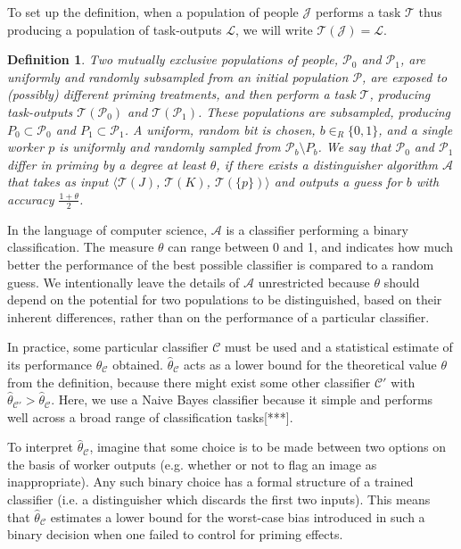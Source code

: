 \documentclass[a4paper]{report}
\newtheorem*{mydef}{Definition}
\begin{document}
To set up the definition, when a population of people $\mathcal{J}$ performs
a task $\mathcal{T}$ thus producing a population of task-outputs $\mathcal{L}$,
we will write $\mathcal{T}(\mathcal{J}) = \mathcal{L}$.

\vspace{2mm}
\begin{mydef}
	\upshape
	Two mutually exclusive populations of people, $\mathcal{P}_0$ and 
	$\mathcal{P}_1$, are uniformly and randomly subsampled from an initial 
	population $\mathcal{P}$, are exposed to (possibly) different priming 
	treatments, and then perform a task $\mathcal{T}$, 
	producing task-outputs $\mathcal{T}(\mathcal{P}_0)$ and 
	$\mathcal{T}(\mathcal{P}_1)$.
	These populations are subsampled, producing 
	$P_0 \subset \mathcal{P}_0$ and
	$P_1 \subset \mathcal{P}_1$. A uniform, random bit is chosen, 
	$b\in _R \{0,1\}$, and a single worker $p$ is uniformly and randomly 
	sampled from 
	$\mathcal{P}_b \setminus P_b$.
	We say that $\mathcal{P}_0$ and $\mathcal{P}_1$ 
	\emph{differ in priming by a degree at least $\theta$},
	if there exists a \emph{distinguisher algorithm} $\mathcal{A}$ that takes as input 
	$\langle\mathcal{T}(J)$, $\mathcal{T}(K)$, $\mathcal{T}(\{p\})\rangle$
	and outputs a guess for $b$ with accuracy $\frac{1+\theta}{2}$.  
\end{mydef}

In the language of computer science, $\mathcal{A}$ is a classifier performing
a binary classification.  The measure $\theta$ can range between 0 and 1, and 
indicates how much better the performance of the best possible classifier is 
compared to a random guess. We intentionally leave the details of 
$\mathcal{A}$ unrestricted because $\theta$ should depend on the potential 
for two populations to be distinguished, based on their inherent differences, 
rather than on the performance of a particular classifier.

In practice, some particular classifier $\mathcal{C}$ must be used and a 
statistical estimate of its performance $\hat{\theta}_\mathcal{C}$ obtained. 
$\hat{\theta}_\mathcal{C}$ acts as a lower bound for the 
theoretical value $\theta$ from the definition, because there might 
exist some other classifier $\mathcal{C}'$ with 
$\hat{\theta}_\mathcal{C'}>\hat{\theta}_\mathcal{C}$.
Here, we use a Naive Bayes classifier because it simple and performs well 
across a broad range of classification tasks[***].

To interpret $\hat{\theta}_\mathcal{C}$, imagine that some choice is to be
made between two options on the basis of worker outputs (e.g. whether or not 
to flag an image as inappropriate). Any such binary choice has a formal 
structure of a trained classifier (i.e. a distinguisher which discards the 
first two inputs). This means that $\hat{\theta}_\mathcal{C}$ estimates a 
lower bound for the worst-case bias introduced in such a binary decision when 
one failed to control for priming effects.
\end{document}
